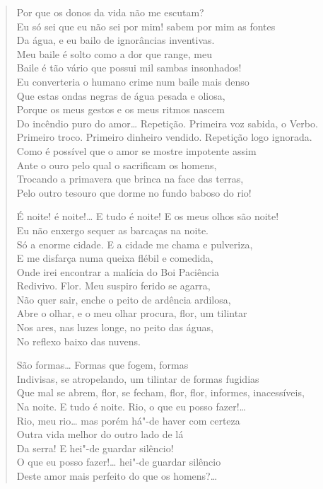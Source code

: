 {\begin{verse}
Por que os donos da vida não me escutam?\\
Eu só sei que eu não sei por mim! sabem por mim as fontes\\
Da água, e eu bailo de ignorâncias inventivas.\\
Meu baile é solto como a dor que range, meu\\
Baile é tão vário que possui mil sambas insonhados!\\
Eu converteria o humano crime num baile mais denso\\
Que estas ondas negras de água pesada e oliosa,\\
Porque os meus gestos e os meus ritmos nascem\\
Do incêndio puro do amor\ldots{} Repetição. Primeira voz sabida, o Verbo.\\
Primeiro troco. Primeiro dinheiro vendido. Repetição logo ignorada.\\
Como é possível que o amor se mostre impotente assim\\
Ante o ouro pelo qual o sacrificam os homens,\\
Trocando a primavera que brinca na face das terras,\\
Pelo outro tesouro que dorme no fundo baboso do rio!

É noite! é noite!\ldots{} E tudo é noite! E os meus olhos são noite!\\
Eu não enxergo sequer as barcaças na noite.\\
Só a enorme cidade. E a cidade me chama e pulveriza,\\
E me disfarça numa queixa flébil e comedida,\\
Onde irei encontrar a malícia do Boi Paciência\\
Redivivo. Flor. Meu suspiro ferido se agarra,\\
Não quer sair, enche o peito de ardência ardilosa,\\
Abre o olhar, e o meu olhar procura, flor, um tilintar\\
Nos ares, nas luzes longe, no peito das águas,\\
No reflexo baixo das nuvens.

São formas\ldots{} Formas que fogem, formas\\
Indivisas, se atropelando, um tilintar de formas fugidias\\
Que mal se abrem, flor, se fecham, flor, flor, informes, inacessíveis,\\
Na noite. E tudo é noite. Rio, o que eu posso fazer!\ldots{}\\
Rio, meu rio\ldots{} mas porém há"-de haver com certeza\\
Outra vida melhor do outro lado de lá\\
Da serra! E hei"-de guardar silêncio!\\
O que eu posso fazer!\ldots{} hei"-de guardar silêncio\\
Deste amor mais perfeito do que os homens?\ldots{}


\end{verse}}
